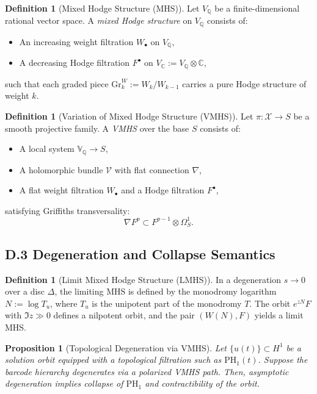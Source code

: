 \documentclass[11pt]{article}
\newtheorem{proposition}[theorem]{Proposition}
\theoremstyle{definition}
\newtheorem{definition}[theorem]{Definition}
\begin{document}
\begin{definition}[Mixed Hodge Structure (MHS)]
Let \( V_{\mathbb{Q}} \) be a finite-dimensional rational vector space. A \emph{mixed Hodge structure} on \( V_{\mathbb{Q}} \) consists of:
\begin{itemize}
    \item An increasing weight filtration \( W_\bullet \) on \( V_{\mathbb{Q}} \),
    \item A decreasing Hodge filtration \( F^\bullet \) on \( V_{\mathbb{C}} := V_{\mathbb{Q}} \otimes \mathbb{C} \),
\end{itemize}
such that each graded piece \( \mathrm{Gr}^W_k := W_k / W_{k-1} \) carries a pure Hodge structure of weight \( k \).
\end{definition}

\begin{definition}[Variation of Mixed Hodge Structure (VMHS)]
Let \( \pi : \mathcal{X} \to S \) be a smooth projective family. A \emph{VMHS} over the base \( S \) consists of:
\begin{itemize}
    \item A local system \( \mathbb{V}_{\mathbb{Q}} \to S \),
    \item A holomorphic bundle \( \mathcal{V} \) with flat connection \( \nabla \),
    \item A flat weight filtration \( W_\bullet \) and a Hodge filtration \( F^\bullet \),
\end{itemize}
satisfying Griffiths transversality:
\[
\nabla F^p \subset F^{p-1} \otimes \Omega^1_S.
\]
\end{definition}

\subsection*{D.3 Degeneration and Collapse Semantics}

\begin{definition}[Limit Mixed Hodge Structure (LMHS)]
In a degeneration \( s \to 0 \) over a disc \( \Delta \), the limiting MHS is defined by the monodromy logarithm \( N := \log T_u \), where \( T_u \) is the unipotent part of the monodromy \( T \). The orbit \( e^{zN} F \) with \( \Im z \gg 0 \) defines a nilpotent orbit, and the pair \( (W(N), F) \) yields a limit MHS.
\end{definition}

\begin{proposition}[Topological Degeneration via VMHS]
Let \( \{ u(t) \} \subset H^1 \) be a solution orbit equipped with a topological filtration such as \( \mathrm{PH}_1(t) \). Suppose the barcode hierarchy degenerates via a polarized VMHS path. Then, asymptotic degeneration implies collapse of \( \mathrm{PH}_1 \) and contractibility of the orbit.
\end{proposition}
\end{document}
